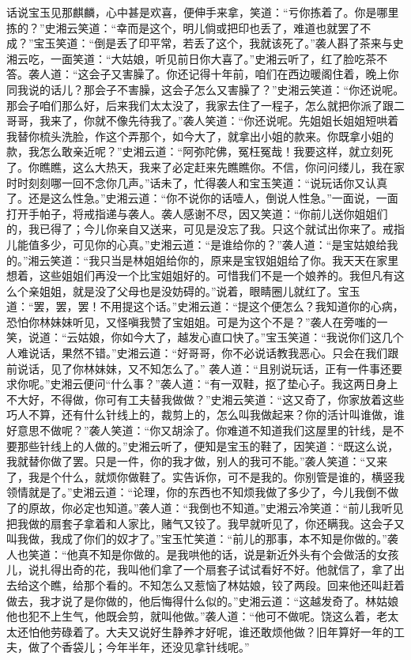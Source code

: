 \documentclass[12pt,oneside]{book}
\begin{document}
话说宝玉见那麒麟，心中甚是欢喜，便伸手来拿，笑道：“亏你拣着了。你是哪里拣的？”史湘云笑道：“幸而是这个，明儿倘或把印也丢了，难道也就罢了不成？”宝玉笑道：“倒是丢了印平常，若丢了这个，我就该死了。”袭人斟了茶来与史湘云吃，一面笑道：“大姑娘，听见前日你大喜了。”史湘云听了，红了脸吃茶不答。袭人道：“这会子又害臊了。你还记得十年前，咱们在西边暖阁住着，晚上你同我说的话儿？那会子不害臊，这会子怎么又害臊了？”史湘云笑道：“你还说呢。那会子咱们那么好，后来我们太太没了，我家去住了一程子，怎么就把你派了跟二哥哥，我来了，你就不像先待我了。”袭人笑道：“你还说呢。先姐姐长姐姐短哄着我替你梳头洗脸，作这个弄那个，如今大了，就拿出小姐的款来。你既拿小姐的款，我怎么敢亲近呢？”史湘云道：“阿弥陀佛，冤枉冤哉！我要这样，就立刻死了。你瞧瞧，这么大热天，我来了必定赶来先瞧瞧你。不信，你问问缕儿，我在家时时刻刻哪一回不念你几声。”话未了，忙得袭人和宝玉笑道：“说玩话你又认真了。还是这么性急。”史湘云道：“你不说你的话噎人，倒说人性急。”一面说，一面打开手帕子，将戒指递与袭人。袭人感谢不尽，因又笑道：“你前儿送你姐姐们的，我已得了；今儿你亲自又送来，可见是没忘了我。只这个就试出你来了。戒指儿能值多少，可见你的心真。”史湘云道：“是谁给你的？”袭人道：“是宝姑娘给我的。”湘云笑道：“我只当是林姐姐给你的，原来是宝钗姐姐给了你。我天天在家里想着，这些姐姐们再没一个比宝姐姐好的。可惜我们不是一个娘养的。我但凡有这么个亲姐姐，就是没了父母也是没妨碍的。”说着，眼睛圈儿就红了。宝玉道：“罢，罢，罢！不用提这个话。”史湘云道：“提这个便怎么？我知道你的心病，恐怕你林妹妹听见，又怪嗔我赞了宝姐姐。可是为这个不是？”袭人在旁嗤的一笑，说道：“云姑娘，你如今大了，越发心直口快了。”宝玉笑道：“我说你们这几个人难说话，果然不错。”史湘云道：“好哥哥，你不必说话教我恶心。只会在我们跟前说话，见了你林妹妹，又不知怎么了。”
袭人道：“且别说玩话，正有一件事还要求你呢。”史湘云便问“什么事？”袭人道：“有一双鞋，抠了垫心子。我这两日身上不大好，不得做，你可有工夫替我做做？”史湘云笑道：“这又奇了，你家放着这些巧人不算，还有什么针线上的，裁剪上的，怎么叫我做起来？你的活计叫谁做，谁好意思不做呢？”袭人笑道：“你又胡涂了。你难道不知道我们这屋里的针线，是不要那些针线上的人做的。”史湘云听了，便知是宝玉的鞋了，因笑道：“既这么说，我就替你做了罢。只是一件，你的我才做，别人的我可不能。”袭人笑道：“又来了，我是个什么，就烦你做鞋了。实告诉你，可不是我的。你别管是谁的，横竖我领情就是了。”史湘云道：“论理，你的东西也不知烦我做了多少了，今儿我倒不做了的原故，你必定也知道。”袭人道：“我倒也不知道。”史湘云冷笑道：“前儿我听见把我做的扇套子拿着和人家比，赌气又铰了。我早就听见了，你还瞒我。这会子又叫我做，我成了你们的奴才了。”宝玉忙笑道：“前儿的那事，本不知是你做的。”袭人也笑道：“他真不知是你做的。是我哄他的话，说是新近外头有个会做活的女孩儿，说扎得出奇的花，我叫他们拿了一个扇套子试试看好不好。他就信了，拿了出去给这个瞧，给那个看的。不知怎么又惹恼了林姑娘，铰了两段。回来他还叫赶着做去，我才说了是你做的，他后悔得什么似的。”史湘云道：“这越发奇了。林姑娘他也犯不上生气，他既会剪，就叫他做。”袭人道：“他可不做呢。饶这么着，老太太还怕他劳碌着了。大夫又说好生静养才好呢，谁还敢烦他做？旧年算好一年的工夫，做了个香袋儿；今年半年，还没见拿针线呢。”
\end{document}
